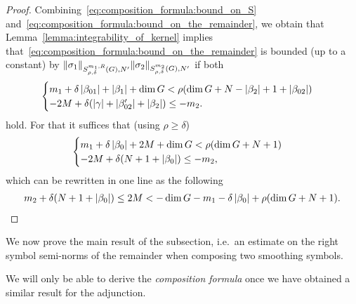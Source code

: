 \begin{proof}
    Combining~\eqref{eq:composition_formula:bound_on_S} and~\eqref{eq:composition_formula:bound_on_the_remainder},
    we obtain that
    Lemma~\eqref{lemma:integrability_of_kernel} implies
    that~\eqref{eq:composition_formula:bound_on_the_remainder} is bounded (up to a constant) by $\SymbolSemiNorm {m_1, R} {\rho, \delta} {N'} {\sigma_1} \SymbolSemiNorm {m_2} {\rho, \delta} {N'} {\sigma_2}$ if both
    \begin{align*}
        \begin{cases}
            m_1 + \delta \abs {\beta_{01}} + \abs {\beta_1} + \dim \Group < \rho (\dim \Group + N - \abs {\beta_2} + 1 + \abs{\beta_{02}})\\
            -2 M + \delta(\abs \gamma + \abs {\beta'_{02}} + \abs {\beta_2}) \leq -m_2.
        \end{cases}
    \end{align*}
    hold.
    For that it suffices that (using $\rho \geq \delta$)
    \begin{align*}
        \begin{cases}
            m_1 + \delta \abs {\beta_{0}} + 2 M + \dim \Group < \rho (\dim \Group + N + 1)\\
            -2M + \delta(N + 1 + \abs {\beta_{0}}) \leq -m_2,
        \end{cases}
    \end{align*}
    which can be rewritten in one line as the following
    \begin{align}
        m_2 + \delta(N + 1 + \abs {\beta_0})
        \leq 2M <
        -\dim \Group - m_1 - \delta \abs {\beta_0} + \rho (\dim \Group + N + 1).
        \label{eq:composition_formula:second_condition_on_M}
    \end{align}
\end{proof}

We now prove the main result of the subsection,
i.e.\ an estimate on the right symbol semi-norms of the remainder
when composing two smoothing symbols.

We will only be able to derive the \emph{composition formula}
once we have obtained a similar result for the adjunction.

